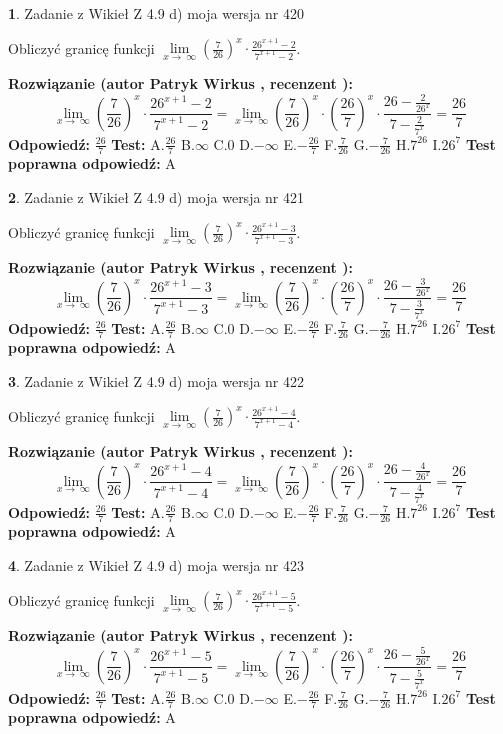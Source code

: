 \documentclass[12pt, a4paper]{article}
\theoremstyle{definition} %
\newtheorem{zad}{}
\newcommand{\zadStart}[1]{\begin{zad}#1\newline}
\newcommand{\zadStop}{\end{zad}}
\newcommand{\rozwStart}[2]{\noindent \textbf{Rozwiązanie (autor #1 , recenzent #2): }\newline}
\newcommand{\rozwStop}{\newline}
\newcommand{\odpStart}{\noindent \textbf{Odpowiedź:}\newline}
\newcommand{\odpStop}{\newline}
\newcommand{\testStart}{\noindent \textbf{Test:}\newline}
\newcommand{\testStop}{\newline}
\newcommand{\kluczStart}{\noindent \textbf{Test poprawna odpowiedź:}\newline}
\newcommand{\kluczStop}{\newline}
\begin{document}
\zadStart{Zadanie z Wikieł Z 4.9 d) moja wersja nr 420}


Obliczyć granicę funkcji  $\lim\limits_{x\to\ \infty}(\frac{7}{26})^{x}\cdot\frac{26^{x+1}-2}{7^{x+1}-2}$.
\zadStop
\rozwStart{Patryk Wirkus}{}
$$\lim\limits_{x\to\ \infty}(\frac{7}{26})^{x}\cdot\frac{26^{x+1}-2}{7^{x+1}-2}=\lim\limits_{x\to\ \infty}(\frac{7}{26})^{x}\cdot(\frac{26}{7})^{x} \cdot \frac{26-\frac{2}{26^{x}}}{7-\frac{2}{7^{x}}} = \frac{26}{7}$$
\rozwStop
\odpStart
$\frac{26}{7}$
\odpStop
\testStart
A.$\frac{26}{7}$ B.$\infty$ C.$0$ D.$-\infty$ E.$-\frac{26}{7}$
F.$\frac{7}{26}$ G.$-\frac{7}{26}$
H.$7^{26}$
I.$26^{7}$
\testStop
\kluczStart
A
\kluczStop



\zadStart{Zadanie z Wikieł Z 4.9 d) moja wersja nr 421}


Obliczyć granicę funkcji  $\lim\limits_{x\to\ \infty}(\frac{7}{26})^{x}\cdot\frac{26^{x+1}-3}{7^{x+1}-3}$.
\zadStop
\rozwStart{Patryk Wirkus}{}
$$\lim\limits_{x\to\ \infty}(\frac{7}{26})^{x}\cdot\frac{26^{x+1}-3}{7^{x+1}-3}=\lim\limits_{x\to\ \infty}(\frac{7}{26})^{x}\cdot(\frac{26}{7})^{x} \cdot \frac{26-\frac{3}{26^{x}}}{7-\frac{3}{7^{x}}} = \frac{26}{7}$$
\rozwStop
\odpStart
$\frac{26}{7}$
\odpStop
\testStart
A.$\frac{26}{7}$ B.$\infty$ C.$0$ D.$-\infty$ E.$-\frac{26}{7}$
F.$\frac{7}{26}$ G.$-\frac{7}{26}$
H.$7^{26}$
I.$26^{7}$
\testStop
\kluczStart
A
\kluczStop



\zadStart{Zadanie z Wikieł Z 4.9 d) moja wersja nr 422}


Obliczyć granicę funkcji  $\lim\limits_{x\to\ \infty}(\frac{7}{26})^{x}\cdot\frac{26^{x+1}-4}{7^{x+1}-4}$.
\zadStop
\rozwStart{Patryk Wirkus}{}
$$\lim\limits_{x\to\ \infty}(\frac{7}{26})^{x}\cdot\frac{26^{x+1}-4}{7^{x+1}-4}=\lim\limits_{x\to\ \infty}(\frac{7}{26})^{x}\cdot(\frac{26}{7})^{x} \cdot \frac{26-\frac{4}{26^{x}}}{7-\frac{4}{7^{x}}} = \frac{26}{7}$$
\rozwStop
\odpStart
$\frac{26}{7}$
\odpStop
\testStart
A.$\frac{26}{7}$ B.$\infty$ C.$0$ D.$-\infty$ E.$-\frac{26}{7}$
F.$\frac{7}{26}$ G.$-\frac{7}{26}$
H.$7^{26}$
I.$26^{7}$
\testStop
\kluczStart
A
\kluczStop



\zadStart{Zadanie z Wikieł Z 4.9 d) moja wersja nr 423}


Obliczyć granicę funkcji  $\lim\limits_{x\to\ \infty}(\frac{7}{26})^{x}\cdot\frac{26^{x+1}-5}{7^{x+1}-5}$.
\zadStop
\rozwStart{Patryk Wirkus}{}
$$\lim\limits_{x\to\ \infty}(\frac{7}{26})^{x}\cdot\frac{26^{x+1}-5}{7^{x+1}-5}=\lim\limits_{x\to\ \infty}(\frac{7}{26})^{x}\cdot(\frac{26}{7})^{x} \cdot \frac{26-\frac{5}{26^{x}}}{7-\frac{5}{7^{x}}} = \frac{26}{7}$$
\rozwStop
\odpStart
$\frac{26}{7}$
\odpStop
\testStart
A.$\frac{26}{7}$ B.$\infty$ C.$0$ D.$-\infty$ E.$-\frac{26}{7}$
F.$\frac{7}{26}$ G.$-\frac{7}{26}$
H.$7^{26}$
I.$26^{7}$
\testStop
\kluczStart
A
\kluczStop
\end{document}
